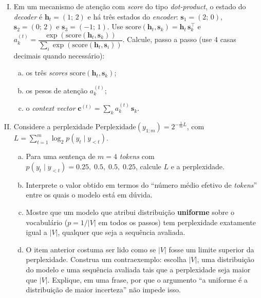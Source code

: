 \documentclass{dlproblemset}
\begin{document}
\begin{enumerate}[I)]

\item Em um mecanismo de atenção com \textit{score} do tipo \textit{dot-product}, o estado do \textit{decoder} é
$\mathbf{h}_t = (1;\, 2)$ e há três estados do \textit{encoder}: $\mathbf{s}_1 = (2;\, 0)$, $\mathbf{s}_2 = (0;\, 2)$ e
$\mathbf{s}_3 = ({-}1;\, 1)$. Use $\text{score}(\mathbf{h}_t, \mathbf{s}_k) = \mathbf{h}_t\,\mathbf{s}_k^{\top}$ e
$a_k^{(t)} = \dfrac{\exp(\text{score}(\mathbf{h}_t, \mathbf{s}_k))}{\sum_i \exp(\text{score}(\mathbf{h}_t, \mathbf{s}_i))}$.
Calcule, passo a passo (use 4 casas decimais quando necessário):
\begin{enumerate}[(a)]
    \item os três \textit{scores} $\text{score}(\mathbf{h}_t, \mathbf{s}_k)$;
    \item os pesos de atenção $a_k^{(t)}$;
    \item o \textit{context vector} $\mathbf{c}^{(t)} = \sum_k a_k^{(t)}\, \mathbf{s}_k$.
\end{enumerate}

\item Considere a perplexidade $\text{Perplexidade}(y_{1:m}) = 2^{-\frac{1}{m} L}$, com
$L = \sum_{t=1}^{m} \log_2 p(y_t \mid y_{<t})$.
\begin{enumerate}[(a)]
    \item Para uma sentença de $m = 4$ \textit{tokens} com
    $p(y_t \mid y_{<t}) = 0.25,\; 0.5,\; 0.5,\; 0.25$, calcule $L$ e a perplexidade.
    \item Interprete o valor obtido em termos do ``número médio efetivo de \textit{tokens}''
    entre os quais o modelo está em dúvida.
    \item {} Mostre que um modelo que atribui distribuição
    \textbf{uniforme} sobre o vocabulário ($p = 1/|V|$ em todos os passos) tem perplexidade
    exatamente igual a $|V|$, qualquer que seja a sequência avaliada.
    \item {} O item anterior costuma ser lido como se $|V|$ fosse um
    limite superior da perplexidade. Construa um contraexemplo: escolha $|V|$, uma distribuição do
    modelo e uma sequência avaliada tais que a perplexidade seja maior que $|V|$. Explique, em uma
    frase, por que o argumento ``a uniforme é a distribuição de maior incerteza'' não impede isso.
\end{enumerate}


\end{enumerate}
\end{document}
